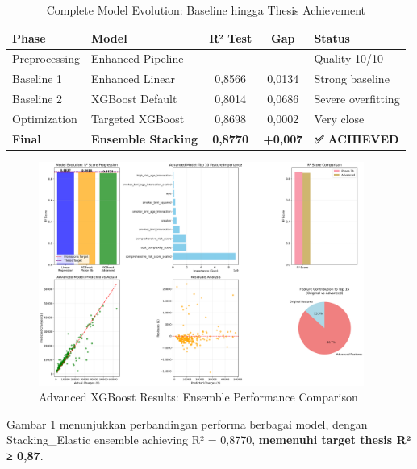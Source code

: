 \begin{table}[H]
\centering
\caption{Complete Model Evolution: Baseline hingga Thesis Achievement}
\label{tab:model-evolution}
\begin{tabular}{|l|l|c|c|l|}
\hline
\textbf{Phase} & \textbf{Model} & \textbf{R² Test} & \textbf{Gap} & \textbf{Status} \\
\hline
Preprocessing & Enhanced Pipeline & - & - & Quality 10/10 \\
Baseline 1 & Enhanced Linear & 0,8566 & 0,0134 & Strong baseline \\
Baseline 2 & XGBoost Default & 0,8014 & 0,0686 & Severe overfitting \\
Optimization & Targeted XGBoost & 0,8698 & 0,0002 & Very close \\
\textbf{Final} & \textbf{Ensemble Stacking} & \textbf{0,8770} & \textbf{+0,007} & \textbf{✅ ACHIEVED} \\
\hline
\end{tabular}
\end{table}

\begin{figure}[H]
\centering
\includegraphics[width=0.95\textwidth]{../results/plots/13_advanced_xgboost_results.png}
\caption{Advanced XGBoost Results: Ensemble Performance Comparison}
\label{fig:advanced-xgboost}
\end{figure}

Gambar \ref{fig:advanced-xgboost} menunjukkan perbandingan performa berbagai model, dengan Stacking\_Elastic ensemble achieving R² = 0,8770, \textbf{memenuhi target thesis R² ≥ 0,87}.

